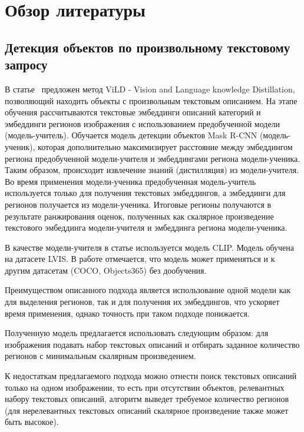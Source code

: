 \documentclass[a4paper,14pt]{article}
\begin{document}
    \newpage


    \section{Обзор литературы}

    \subsection{Детекция объектов по произвольному текстовому запросу}

    В статье~\cite{ViLD} предложен метод ViLD - Vision and Language knowledge Distillation, позволяющий находить объекты с произвольным текстовым описанием.
    На этапе обучения рассчитываются текстовые эмбеддинги описаний категорий и эмбеддинги регионов изображения с использованием предобученной модели (модель-учитель).
    Обучается модель детекции объектов Mask R-CNN (модель-ученик), которая дополнительно максимизирует расстояние между эмбеддингом региона предобученной модели-учителя и эмбеддингами региона модели-ученика.
    Таким образом, происходит извлечение знаний (дистилляция) из модели-учителя.
    Во время применения модели-ученика предобученная модель-учитель используется только для получения текстовых эмбеддингов, а эмбеддинги для регионов получается из модели-ученика.
    Итоговые регионы получаются в результате ранжирования оценок, полученных как скалярное произведение текстового эмбеддинга модели-учителя и эмбеддинга региона модели-ученика.

    В качестве модели-учителя в статье используется модель CLIP.
    Модель обучена на датасете LVIS.
    В работе отмечается, что модель может применяться и к другим датасетам (COCO, Objects365) без дообучения.

    Преимуществом описанного подхода является использование одной модели как для выделения регионов, так и для получения их эмбеддингов, что ускоряет время применения, однако точность при таком подходе понижается.

    Полученную модель предлагается использовать следующим образом: для изображения подавать набор текстовых описаний и отбирать заданное количество регионов с минимальным скалярным произведением.

    К недостаткам предлагаемого подхода можно отнести поиск текстовых описаний только на одном изображении, то есть при отсутствии объектов, релевантных набору текстовых описаний, алгоритм выведет требуемое количество регионов (для нерелевантных текстовых описаний скалярное произведение также может быть высокое).
    
\end{document}

